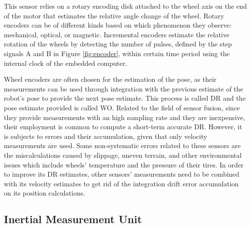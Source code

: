 This sensor relies on a rotary encoding disk attached to the wheel axis on the end of the motor that estimates the relative angle change of the wheel.
Rotary encoders can be of different kinds based on which phenomenon they observe: mechanical, optical, or magnetic.
Incremental encoders estimate the relative rotation of the wheels by detecting the number of pulses, defined by the step signals A and B in Figure \ref{fig:encoder}, within certain time period using the internal clock of the embedded computer.

Wheel encoders are often chosen for the estimation of the pose, as their measurements can be used through integration with the previous estimate of the robot's pose to provide the next pose estimate.
This process is called \gls{DR} and the pose estimate provided is called \gls{WO}.
Related to the field of sensor fusion, since they provide measurements with an high sampling rate and they are inexpensive, their employment is common to compute a short-term accurate \gls{DR}.
However, it is subjects to errors and their accumulation, given that only velocity measurements are used.
Some non-systematic errors related to these sensors are the miscalculations caused by slippage, uneven terrain, and other environmental issues which include wheels' temperature and the pressure of their tires.
In order to improve its \gls{DR} estimates, other sensors' measurements need to be combined with its velocity estimates to get rid of the integration drift error accumulation on its position calculations.


\subsection{Inertial Measurement Unit}

